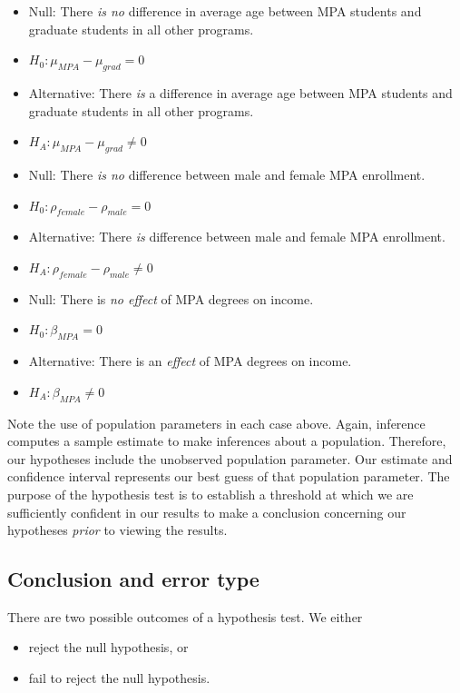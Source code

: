 \documentclass[
]{book}
\providecommand{\tightlist}{%
  \setlength{\itemsep}{0pt}\setlength{\parskip}{0pt}}
\begin{document}
\begin{itemize}
\item
  Null: There \emph{is no} difference in average age between MPA students and graduate students in all other programs.
\item
  \(H_0: \mu_{MPA}-\mu_{grad} = 0\)
\item
  Alternative: There \emph{is} a difference in average age between MPA students and graduate students in all other programs.
\item
  \(H_A: \mu_{MPA}-\mu_{grad} \neq 0\)
\item
  Null: There \emph{is no} difference between male and female MPA enrollment.
\item
  \(H_0: \rho_{female}-\rho_{male} = 0\)
\item
  Alternative: There \emph{is} difference between male and female MPA enrollment.
\item
  \(H_A: \rho_{female}-\rho_{male} \neq 0\)
\item
  Null: There is \emph{no effect} of MPA degrees on income.
\item
  \(H_0: \beta_{MPA} = 0\)
\item
  Alternative: There is an \emph{effect} of MPA degrees on income.
\item
  \(H_A: \beta_{MPA} \neq 0\)
\end{itemize}

Note the use of population parameters in each case above. Again, inference computes a sample estimate to make inferences about a population. Therefore, our hypotheses include the unobserved population parameter. Our estimate and confidence interval represents our best guess of that population parameter. The purpose of the hypothesis test is to establish a threshold at which we are sufficiently confident in our results to make a conclusion concerning our hypotheses \emph{prior} to viewing the results.

\hypertarget{conclusion-and-error-type}{%
\subsection{Conclusion and error type}\label{conclusion-and-error-type}}

There are two possible outcomes of a hypothesis test. We either

\begin{itemize}
\tightlist
\item
  reject the null hypothesis, or
\item
  fail to reject the null hypothesis.
\end{itemize}
\end{document}
